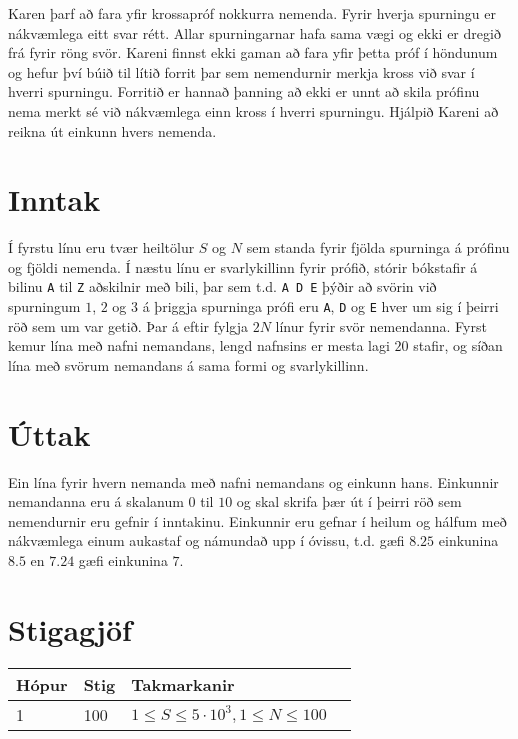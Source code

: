 Karen þarf að fara yfir krossapróf nokkurra nemenda.
Fyrir hverja spurningu er nákvæmlega eitt svar rétt.
Allar spurningarnar hafa sama vægi og ekki er dregið frá fyrir röng svör.
Kareni finnst ekki gaman að fara yfir þetta próf í höndunum og hefur því búið til lítið forrit þar sem nemendurnir merkja kross við svar í hverri spurningu.
Forritið er hannað þanning að ekki er unnt að skila prófinu nema merkt sé við nákvæmlega einn kross í hverri spurningu.
Hjálpið Kareni að reikna út einkunn hvers nemenda.

\section*{Inntak}
Í fyrstu línu eru tvær heiltölur $S$ og $N$ sem standa fyrir fjölda spurninga á prófinu og fjöldi nemenda.
Í næstu línu er svarlykillinn fyrir prófið, stórir bókstafir á bilinu \texttt{A} til \texttt{Z} aðskilnir með bili, þar sem t.d. \texttt{A D E} þýðir að svörin við spurningum $1$, $2$ og $3$ á þriggja spurninga prófi eru \texttt{A}, \texttt{D} og \texttt{E} hver um sig í þeirri röð sem um var getið.
Þar á eftir fylgja $2N$ línur fyrir svör nemendanna. Fyrst kemur lína með nafni nemandans, lengd nafnsins er mesta lagi $20$ stafir, og síðan lína með svörum nemandans á sama formi og svarlykillinn.

\section*{Úttak}
Ein lína fyrir hvern nemanda með nafni nemandans og einkunn hans.
Einkunnir nemandanna eru á skalanum $0$ til $10$ og skal skrifa þær út í þeirri röð sem nemendurnir eru gefnir í inntakinu. Einkunnir eru gefnar í heilum og hálfum með nákvæmlega einum aukastaf og námundað upp í óvissu, t.d. gæfi $8.25$ einkunina $8.5$ en $7.24$ gæfi einkunina $7$.

\section*{Stigagjöf}
\begin{tabular}{|l|l|l|l|}
\hline
Hópur & Stig & Takmarkanir \\ \hline
1     & 100     & $1 \leq S \leq 5 \cdot 10^3, 1 \leq N \leq 100$ \\ \hline
\end{tabular}
